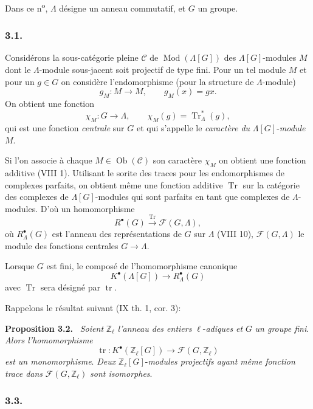\documentclass[11pt]{article}
\newenvironment{statement}[1]{\par\medskip\noindent\textbf{#1.}\ }{\par\medskip}
\providecommand{\Tr}{\operatorname{Tr}}
\providecommand{\Tr}{\operatorname{Tr}}
\providecommand{\Tr}{\operatorname{Tr}}
\providecommand{\Tr}{\operatorname{Tr}}
\providecommand{\Mod}{\operatorname{Mod}}
\providecommand{\tr}{\operatorname{tr}}
\providecommand{\Tr}{\operatorname{Tr}}
\begin{document}
Dans ce n\textsuperscript{o}, $\Lambda$ désigne un anneau commutatif, et $G$ un groupe.

\subsubsection*{3.1.}

Considérons la sous-catégorie pleine $\mathcal C$ de $\Mod(\Lambda[G])$ des $\Lambda[G]$-modules $M$ dont le $\Lambda$-module sous-jacent soit projectif de type fini. Pour un tel module $M$ et pour un $g\in G$ on considère l'endomorphisme (pour la structure de $\Lambda$-module)
\[
g_M:M\longrightarrow M,
\qquad g_M(x)=gx.
\]
On obtient une fonction
\[
\chi_M:G\longrightarrow \Lambda,
\qquad \chi_M(g)=\Tr^*_\Lambda(g),
\]
qui est une fonction \emph{centrale} sur $G$ et qui s'appelle le \emph{caractère du} $\Lambda[G]$-\emph{module} $M$.

Si l'on associe à chaque $M\in\operatorname{Ob}(\mathcal C)$ son caractère $\chi_M$ on obtient une fonction additive (VIII 1). Utilisant le sorite des traces pour les endomorphismes de complexes parfaits, on obtient même une fonction additive $\Tr$ sur la catégorie des complexes de $\Lambda[G]$-modules qui sont parfaits en tant que complexes de $\Lambda$-modules. D'où un homomorphisme
\[
R^{\bullet}(G)\xrightarrow{\Tr}\mathcal F(G,\Lambda),
\]
où $R^{\bullet}_{\Lambda}(G)$ est l'anneau des représentations de $G$ sur $\Lambda$ (VIII 10), $\mathcal F(G,\Lambda)$ le module des fonctions centrales $G\to\Lambda$.

Lorsque $G$ est fini, le composé de l'homomorphisme canonique
\[
K^{\bullet}(\Lambda[G])\longrightarrow R^{\bullet}_{\Lambda}(G)
\]
avec $\Tr$ sera désigné par $\tr$.

Rappelons le résultat suivant (IX th. 1, cor. 3):

\begin{statement}{Proposition 3.2}
\emph{Soient} $\mathbb Z_\ell$ \emph{l'anneau des entiers} $\ell$-\emph{adiques et} $G$ \emph{un groupe fini}. \emph{Alors l'homomorphisme}
\[
\tr:K^{\bullet}(\mathbb Z_\ell[G])\longrightarrow \mathcal F(G,\mathbb Z_\ell)
\]
\emph{est un monomorphisme}. \emph{Deux} $\mathbb Z_\ell[G]$-\emph{modules projectifs ayant même fonction trace dans} $\mathcal F(G,\mathbb Z_\ell)$ \emph{sont isomorphes}.
\end{statement}

\subsubsection*{3.3.}
\end{document}
